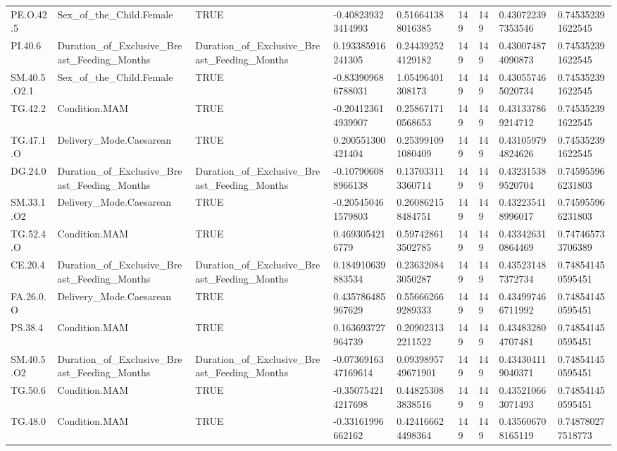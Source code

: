 \begin{longtable}{lllllllll}
PE.O.42.5 & Sex\_of\_the\_Child.Female & TRUE & -0.408239323414993 & 0.516641388016385 & 149 & 149 & 0.430722397353546 & 0.745352391622545 \\
PI.40.6 & Duration\_of\_Exclusive\_Breast\_Feeding\_Months & Duration\_of\_Exclusive\_Breast\_Feeding\_Months & 0.193385916241305 & 0.244392524129182 & 149 & 149 & 0.430074874090873 & 0.745352391622545 \\
SM.40.5.O2.1 & Sex\_of\_the\_Child.Female & TRUE & -0.833909686788031 & 1.05496401308173 & 149 & 149 & 0.430557465020734 & 0.745352391622545 \\
TG.42.2 & Condition.MAM & TRUE & -0.204123614939907 & 0.258671710568653 & 149 & 149 & 0.431337869214712 & 0.745352391622545 \\
TG.47.1.O & Delivery\_Mode.Caesarean & TRUE & 0.200551300421404 & 0.253991091080409 & 149 & 149 & 0.431059794824626 & 0.745352391622545 \\
DG.24.0 & Duration\_of\_Exclusive\_Breast\_Feeding\_Months & Duration\_of\_Exclusive\_Breast\_Feeding\_Months & -0.107906088966138 & 0.137033113360714 & 149 & 149 & 0.432315389520704 & 0.745955966231803 \\
SM.33.1.O2 & Delivery\_Mode.Caesarean & TRUE & -0.205450461579803 & 0.260862158484751 & 149 & 149 & 0.432235418996017 & 0.745955966231803 \\
TG.52.4.O & Condition.MAM & TRUE & 0.4693054216779 & 0.597428613502785 & 149 & 149 & 0.433426310864469 & 0.747465733706389 \\
CE.20.4 & Duration\_of\_Exclusive\_Breast\_Feeding\_Months & Duration\_of\_Exclusive\_Breast\_Feeding\_Months & 0.184910639883534 & 0.236320843050287 & 149 & 149 & 0.435231487372734 & 0.748541450595451 \\
FA.26.0.O & Delivery\_Mode.Caesarean & TRUE & 0.435786485967629 & 0.556662669289333 & 149 & 149 & 0.434997466711992 & 0.748541450595451 \\
PS.38.4 & Condition.MAM & TRUE & 0.163693727964739 & 0.209023132211522 & 149 & 149 & 0.434832804707481 & 0.748541450595451 \\
SM.40.5.O2 & Duration\_of\_Exclusive\_Breast\_Feeding\_Months & Duration\_of\_Exclusive\_Breast\_Feeding\_Months & -0.0736916347169614 & 0.0939895749671901 & 149 & 149 & 0.434304119040371 & 0.748541450595451 \\
TG.50.6 & Condition.MAM & TRUE & -0.350754214217698 & 0.448253083838516 & 149 & 149 & 0.435210663071493 & 0.748541450595451 \\
TG.48.0 & Condition.MAM & TRUE & -0.33161996662162 & 0.424166624498364 & 149 & 149 & 0.435606708165119 & 0.748780277518773 \\

\end{longtable}
